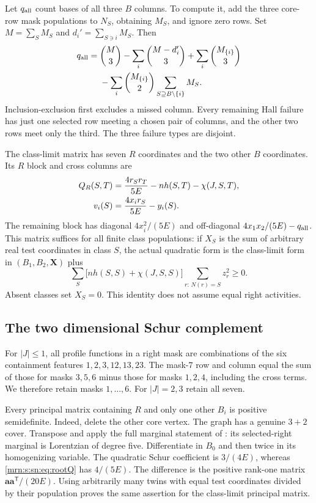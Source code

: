 \documentclass[11pt,a4paper]{article}
\theoremstyle{remark}\newtheorem{remark}[theorem]{Remark}
\begin{document}
Let $q_{\rm all}$ count bases of all three $B$ columns. To compute it,
add the three core-row mask populations to $N_S$, obtaining $M_S$, and ignore
zero rows. Set $M=\sum_SM_S$ and $d_i'=\sum_{S\ni i}M_S$. Then
\begin{align}
q_{\rm all}={}&\binom M3-\sum_i\binom{M-d_i'}3
   +\sum_i\binom{M_{\{i\}}}3\notag\\
 &-\sum_i\binom{M_{\{i\}}}2
       \sum_{S\supseteq B\setminus\{i\}}M_S.\label{mrn:s:sn:eq:q}
\end{align}
Inclusion-exclusion first excludes a missed column. Every remaining Hall
failure has just one selected row meeting a chosen pair of columns, and the
other two rows meet only the third. The three failure types are disjoint.

The class-limit matrix has seven $R$ coordinates and the two other $B$
coordinates. Its $R$ block and cross columns are
\begin{align}
 Q_R(S,T)&=\frac{4r_Sr_T}{5E}-nh(S,T)-\chi(J,S,T),\label{mrn:s:sn:eq:Rblock}\\
 v_i(S)&=\frac{4x_ir_S}{5E}-y_i(S).\notag
\end{align}
The remaining block has diagonal $4x_i^2/(5E)$ and off-diagonal
$4x_1x_2/(5E)-q_{\rm all}$.
This matrix suffices for all finite class populations: if $X_S$ is the sum
of arbitrary real test coordinates in class $S$, the actual quadratic form
is the class-limit form in $(B_1,B_2,\mathbf X)$ plus
\[
 \sum_S\bigl[nh(S,S)+\chi(J,S,S)\bigr]
           \sum_{r:\,N(r)=S}z_r^2\ge0.
\]
Absent classes set $X_S=0$. This identity does not assume equal right activities.

\subsection{The two dimensional Schur complement}
For $|J|\le1$, all profile functions in a right mask are combinations of the
six containment features $1,2,3,12,13,23$. The mask-$7$ row and column equal
the sum of those for masks $3,5,6$ minus those for masks $1,2,4$, including
the cross terms. We therefore retain masks $1,\ldots,6$.
For $|J|=2,3$ retain all seven.

Every principal matrix containing $R$ and only one other $B_i$ is positive
semidefinite. Indeed, delete the other core vertex. The graph has a genuine
$3+2$ cover. Transpose and apply the full marginal statement of \cite{b:m74}:
its selected-right marginal is Lorentzian of degree five. Differentiate in
$B_0$ and then twice in its homogenizing variable. The quadratic Schur
coefficient is $3/(4E)$, whereas \eqref{mrn:s:sn:eq:rootQ} has $4/(5E)$.
The difference is the positive rank-one matrix
$\mathbf a\mathbf a^{\mathsf T}/(20E)$.
Using arbitrarily many twins with equal test coordinates divided by their
population proves the same assertion for the class-limit principal matrix.
\end{document}
